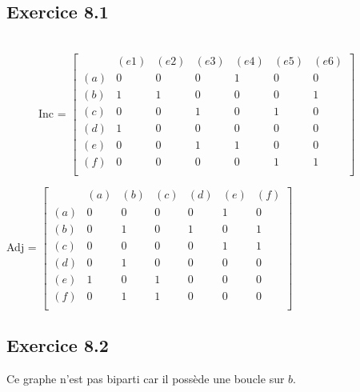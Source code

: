 \documentclass[fontsize=10pt]{article}
\begin{document}
\subsection*{Exercice 8.1}
$\phantom{a}$\\
\begin{figure}[!htb]
    \centering
    \begin{minipage}{.7\textwidth}
        Inc = $\begin{bmatrix}
            &(e1)&(e2)&(e3)&(e4)&(e5)&(e6)\\
            (a)&0&0&0&1&0&0\\
            (b)&1&1&0&0&0&1\\
            (c)&0&0&1&0&1&0\\
            (d)&1&0&0&0&0&0\\
            (e)&0&0&1&1&0&0\\
            (f)&0&0&0&0&1&1\\
        \end{bmatrix}$
    \end{minipage}%
    \begin{minipage}{.3\textwidth}
    \end{minipage}
\end{figure}

Adj = $\begin{bmatrix}
    &(a)&(b)&(c)&(d)&(e)&(f)\\
    (a)&0&0&0&0&1&0\\
    (b)&0&1&0&1&0&1\\
    (c)&0&0&0&0&1&1\\
    (d)&0&1&0&0&0&0\\
    (e)&1&0&1&0&0&0\\
    (f)&0&1&1&0&0&0\\
\end{bmatrix}$


\subsection*{Exercice 8.2}
Ce graphe n'est pas biparti car il possède une boucle sur $b$.
\end{document}
